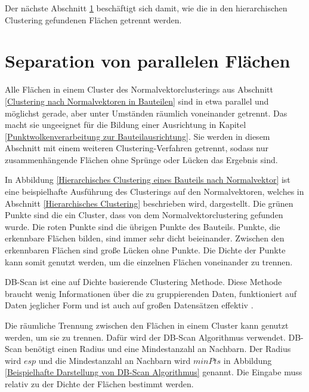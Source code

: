 \smallskip

Der nächste Abschnitt \ref{Separation von parallelen Flächen} beschäftigt sich damit, wie die in den hierarchischen Clustering gefundenen Flächen getrennt werden.

\section{Separation von parallelen Flächen}
\label{Separation von parallelen Flächen}

Alle Flächen in einem Cluster des Normalvektorclusterings aus Abschnitt \ref{Clustering nach Normalvektoren in Bauteilen} sind in etwa parallel und möglichst gerade, aber unter Umständen räumlich voneinander getrennt. 
Das macht sie ungeeignet für die Bildung einer Ausrichtung in Kapitel \ref{Punktwolkenverarbeitung zur Bauteilausrichtung}. Sie werden in diesem Abschnitt mit einem weiteren Clustering-Verfahren getrennt, sodass nur zusammenhängende Flächen ohne Sprünge oder Lücken das Ergebnis sind.

\smallskip

In Abbildung \ref{Hierarchisches Clustering eines Bauteils nach Normalvektor} ist eine beispielhafte Ausführung des Clusterings auf den Normalvektoren, welches in Abschnitt \ref{Hierarchisches Clustering} beschrieben wird, dargestellt.
Die grünen Punkte sind die ein Cluster, dass von dem Normalvektorclustering gefunden wurde. Die roten Punkte sind die übrigen Punkte des Bauteils.
Punkte, die erkennbare Flächen bilden, sind immer sehr dicht beieinander. Zwischen den erkennbaren Flächen sind große Lücken ohne Punkte. Die Dichte der Punkte kann somit genutzt werden, um die einzelnen Flächen voneinander zu trennen.

\smallskip

DB-Scan ist eine auf Dichte basierende Clustering Methode. Diese Methode braucht wenig Informationen über die zu gruppierenden Daten, funktioniert auf Daten jeglicher Form und ist auch auf großen Datensätzen effektiv \cite{DBScann}.

\smallskip

Die räumliche Trennung zwischen den Flächen in einem Cluster kann genutzt werden, um sie zu trennen. Dafür wird der DB-Scan Algorithmus verwendet. DB-Scan benötigt einen Radius und eine Mindestanzahl an Nachbarn. 
Der Radius wird $esp$ und die Mindestanzahl an Nachbarn wird $minPts$ in Abbildung \ref{Beispielhafte Darstellung von DB-Scan Algorithmus} genannt. Die Eingabe muss relativ zu der Dichte der Flächen bestimmt werden. 

